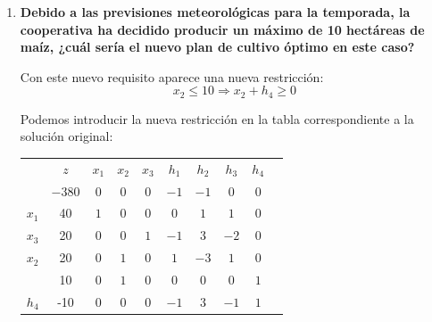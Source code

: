 \begin{enumerate}[label=\alph*)]
    Se trata de una nueva actividad, para la cual habría que definir una nueva variable $x_4$ con:
    
    \begin{itemize}
    \item $c_{x_4} = 4.5$.
    \item $A_{x_4} =
    \begin{pmatrix}
        3.5 \\[2pt]
        1 \\[2pt]
        0
    \end{pmatrix}$.
    \end{itemize}

    Sería interesante cultivar soja si $V^B_{x_4}>0$:

    \[
    V^B_{x_4} = c_{x_4} - \pi^BA_{x_4} = 4.5 - 
    \begin{pmatrix}
    1 & 1 & 0    
    \end{pmatrix}
    \begin{pmatrix}
        3.5 \\[2pt]
        1 \\[2pt]
        0
    \end{pmatrix} = 4.5-4.5=0
    \]
    Es decir, se podría cultivar soja pero no tendría impacto sobre el total de biomasa generada.

    \item \textbf{Debido a las previsiones meteorológicas para la temporada, la cooperativa ha decidido producir un máximo de 10 hectáreas de maíz, ¿cuál sería el nuevo plan de cultivo óptimo en este caso?}

    Con este nuevo requisito aparece una nueva restricción:
    \[
    x_2 \leq 10 \Rightarrow x_2 + h_4 \geq 0
    \]

    Podemos introducir la nueva restricción en la tabla correspondiente a la solución original:

    \begin{center}
    \begin{tabular}{c|c|cccccccc|}
     & $z$ & $x_1$ & $x_2$ & $x_3$ & $h_1$ & $h_2$ & $h_3$ & $h_4$\\ 
          & $-380$ & $0$ & $0$ & $0$ & $-1$ & $-1$ & $0$ & $0$ \\ 
    \hline
    $x_1$ & 40  & $1$ & $0$ & $0$ & $0$ & $1$ & $1$ & $0$\\ 
    $x_3$ & 20  & $0$ & $0$ & $1$ & $-1$ & $3$ & $-2$ & $0$\\ 
    $x_2$ & 20  & $0$ & $1$ & $0$ & $1$ & $-3$ & $1$ & $0$\\
    \hline
          & 10  & $0$ & $1$ & $0$ & $0$ & $0$ & $0$ & $1$\\
    \hline
    $h_4$ & -10  & $0$ & $0$ & $0$ & $-1$ & $3$ & $-1$ & $1$\\
    \end{tabular}
    \end{center}


\end{enumerate}
